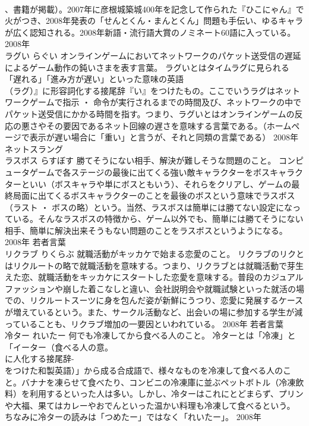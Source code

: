 \documentclass[8pt]{extreport}
\begin{document}
\begin{CJK}{UTF8}{min}
\\	、書籍が掲載）。2007年に彦根城築城400年を記念して作られた『ひこにゃん』で火がつき、2008年発表の「せんとくん・まんとくん」問題も手伝い、ゆるキャラが広く認知される。2008年新語・流行語大賞のノミネート60語に入っている。	2008年	
\\	ラグい	らぐい	オンラインゲームにおいてネットワークのパケット送受信の遅延によるゲーム動作の鈍いさまを表す言葉。	ラグいとはタイムラグに見られる「遅れる」「進み方が遅い」といった意味の英語
\\	（ラグ）』に形容詞化する接尾辞『い』をつけたもの。ここでいうラグはネットワークゲームで指示 ・ 命令が実行されるまでの時間及び、ネットワークの中でパケット送受信にかかる時間を指す。つまり、ラグいとはオンラインゲームの反応の悪さやその要因であるネット回線の遅さを意味する言葉である。（ホームページで表示が遅い場合に「重い」と言うが、それと同類の言葉である）	2008年	ネットスラング	
\\	ラスボス	らすぼす	勝てそうにない相手、解決が難しそうな問題のこと。	コンピュータゲームで各ステージの最後に出てくる強い敵キャラクターをボスキャラクターといい（ボスキャラや単にボスともいう）、それらをクリアし、ゲームの最終局面に出てくるボスキャラクターのことを最後のボスという意味でラスボス（ラスト ・ ボスの略）という。当然、ラスボスは簡単には勝てない設定になっている。そんなラスボスの特徴から、ゲーム以外でも、簡単には勝てそうにない相手、簡単に解決出来そうもない問題のことをラスボスというようになる。	2008年	若者言葉	
\\	リクラブ	りくらぶ	就職活動がキッカケで始まる恋愛のこと。	リクラブのリクとはリクルートの略で就職活動を意味する。つまり、リクラブとは就職活動で芽生えた恋、就職活動をキッカケにスタートした恋愛を意味する。普段のカジュアルファッションや崩した着こなしと違い、会社説明会や就職試験といった就活の場での、リクルートスーツに身を包んだ姿が新鮮にうつり、恋愛に発展するケースが増えているという。また、サークル活動など、出会いの場に参加する学生が減っていることも、リクラブ増加の一要因といわれている。	2008年	若者言葉	
\\	冷ター	れいたー	何でも冷凍してから食べる人のこと。	冷ターとは「冷凍」と「イーター（食べる人の意。
\\	に人化する接尾辞-
\\	をつけた和製英語）」から成る合成語で、様々なものを冷凍して食べる人のこと。バナナを凍らせて食べたり、コンビニの冷凍庫に並ぶペットボトル（冷凍飲料）を利用するといった人は多い。しかし、冷ターはこれにとどまらず、プリンや大福、果てはカレーやおでんといった温かい料理も冷凍して食べるという。 ちなみに冷ターの読みは「つめたー」ではなく「れいたー」。	2008年	

\end{CJK}
\end{document}
